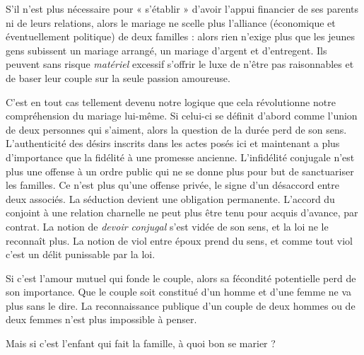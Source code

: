  S'il n'est plus nécessaire pour « s'établir » d'avoir l'appui financier de ses parents ni de leurs relations, alors le mariage ne scelle plus l'alliance (économique et éventuellement politique) de deux familles : alors rien n'exige plus que les jeunes gens subissent un mariage arrangé, un mariage d'argent et d'entregent. Ils peuvent sans risque \emph{matériel} excessif s'offrir le luxe de n'être pas raisonnables et de baser leur couple sur la seule passion amoureuse.

 C'est en tout cas tellement devenu notre logique que cela révolutionne notre compréhension du mariage lui-même. Si celui-ci se définit d'abord comme l'union de deux personnes qui s'aiment, alors la question de la durée perd de son sens. L'authenticité des désirs inscrits dans les actes posés ici et maintenant a plus d'importance que la fidélité à une promesse ancienne. L'infidélité conjugale n'est plus une offense à un ordre public qui ne se donne plus pour but de sanctuariser les familles. Ce n'est plus qu'une offense privée, le signe d'un désaccord entre deux associés. La séduction devient une obligation permanente. L'accord du conjoint à une relation charnelle ne peut plus être tenu pour acquis d'avance, par contrat. La notion de \emph{devoir conjugal} s'est vidée de son sens, et la loi ne le reconnaît plus. La notion de viol entre époux prend du sens, et comme tout viol c'est un délit punissable par la loi. 

 Si c'est l'amour mutuel qui fonde le couple, alors sa fécondité potentielle perd de son importance. Que le couple soit constitué d'un homme et d'une femme ne va plus sans le dire. La reconnaissance publique d'un couple de deux hommes ou de deux femmes n'est plus impossible à penser. 

 Mais si c'est l'enfant qui fait la famille, à quoi bon se marier ?
